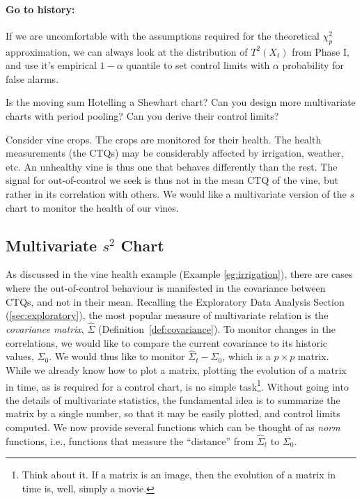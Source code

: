 \paragraph{Go to history:}
If we are uncomfortable with the assumptions required for the theoretical $\chi^2_p$ approximation, we can always look at the distribution of $T^2(X_t)$ from Phase I, and use it's empirical $1-\alpha$ quantile to set control limits with $\alpha$ probability for false alarms.



\begin{think}
	Is the moving sum Hotelling a Shewhart chart? 
	Can you design more multivariate charts with period pooling? 
	Can you derive their control limits?
\end{think}









\begin{example}
\label{eg:irrigation}
Consider vine crops.
The crops are monitored for their health.
The health measurements (the CTQs) may be considerably affected by irrigation, weather, etc.
An unhealthy vine is thus one that behaves differently than the rest. 
The signal for out-of-control we seek is thus not in the mean CTQ of the vine, but rather in its correlation with others. 
We would like a multivariate version of the $s$ chart to monitor the health of our vines.  
\end{example}




\subsection[Multivariate s chart]{Multivariate $s^2$ Chart}
\label{sec:multivarite_s}

As discussed in the vine health example (Example \ref{eg:irrigation}), there are cases where the out-of-control behaviour is manifested in the covariance between CTQs, and not in their mean.
Recalling the Exploratory Data Analysis Section (\ref{sec:exploratory}), the most popular measure of multivariate relation is the \emph{covariance matrix}, $\hat{\Sigma}$ (Definition~\ref{def:covariance}).
To monitor changes in the correlations, we would like to compare the current covariance to its historic values, $\Sigma_0$. 
We would thus like to monitor $\hat{\Sigma}_t-\Sigma_0$, which is a $p\times p$ matrix. 
While we already know how to plot a matrix, plotting the evolution of a matrix in time, as is required for a control chart, is no simple task\footnote{Think about it. If a matrix is an image, then the evolution of a matrix in time is, well, simply a movie.}. 
Without going into the details of multivariate statistics, the fundamental idea is to summarize the matrix by a single number, so that it may be easily plotted, and control limits computed. 
We now provide several functions which can be thought of as \emph{norm} functions, i.e., functions that measure the ``distance'' from $\hat{\Sigma}_t$ to $\Sigma_0$. 




